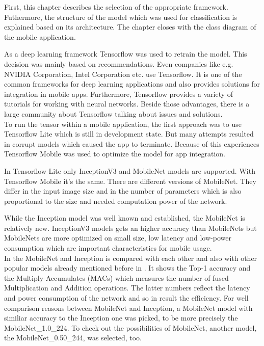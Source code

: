 First, this chapter describes the selection of the appropriate framework. Futhermore, the structure of the model which was used for classification is explained based on its architecture. The chapter closes with the class diagram of the mobile application.

As a deep learning framework Tensorflow was used to retrain the model. This decision was mainly based on recommendations. Even companies like e.g. NVIDIA Corporation, Intel Corporation etc. use Tensorflow. It is one of the common frameworks for deep learning applications and also provides solutions for integration in mobile apps. Furthermore, Tensorflow provides a variety of tutorials for working with neural networks. Beside those advantages, there is a large community about Tensorflow talking about issues and solutions. \\

To run the tensor within a mobile application, the first approach was to use Tensorflow Lite which is still in development state. But many attempts resulted in corrupt models which caused the app to terminate. Because of this experiences Tensorflow Mobile was used to optimize the model for app integration. 
		
In Tensorflow Lite only InceptionV3 and MobileNet models are supported. With Tensorflow Mobile it's the same. There are different versions of MobileNet. They differ in the input image size and in the number of parameters which is also proportional to the size and needed computation power of the network.

While the Inception model was well known and established, the MobileNet is relatively new. InceptionV3 models gets an higher accuracy than MobileNets but MobileNets are more optimized on small size, low latency and low-power consumption which are important characteristics for mobile usage. \citep{TensorFlowMobileNet} \\


In  the MobileNet and Inception is compared with each other and also with other popular models already mentioned before in . It shows the Top-1 accuracy and the Multiply-Accumulates (MACs) which measures the number of fused Multiplication and Addition operations. The latter numbers reflect the latency and power consumption of the network and so in result the efficiency. For well comparison reasons between MobileNet and Inception, a MobileNet model with similiar accuracy to the Inception one was picked, to be more precisely the MobileNet\_1.0\_224. To check out the possibilities of MobileNet, another model, the MobileNet\_0.50\_244, was selected, too.

